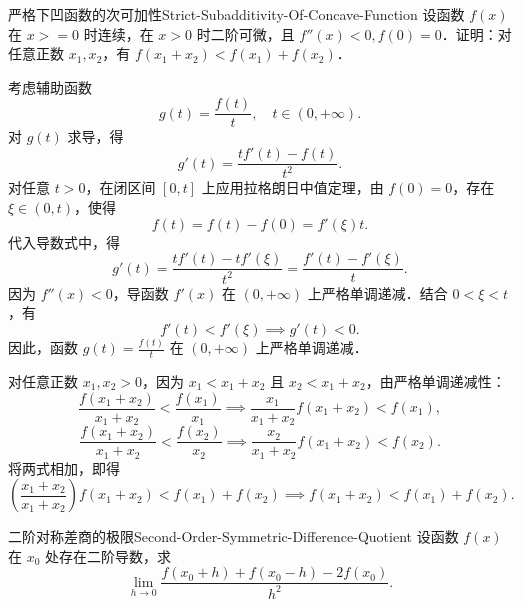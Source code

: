 \begin{problem}{严格下凹函数的次可加性}{Strict-Subadditivity-Of-Concave-Function}
    设函数 $f(x)$ 在 $x >= 0$ 时连续，在 $x > 0$ 时二阶可微，且 $f''(x) < 0, f(0) = 0$．证明：对任意正数 $x_1, x_2$，有 $f(x_1 + x_2) < f(x_1) + f(x_2)$．
\end{problem}

\begin{myproof}
    考虑辅助函数
    \begin{equation}
        g(t) = \frac{f(t)}{t}, \quad t \in (0, +\infty).
    \end{equation}
    对 $g(t)$ 求导，得
    \begin{equation}
        g'(t) = \frac{t f'(t) - f(t)}{t^2}.
    \end{equation}
    对任意 $t > 0$，在闭区间 $[0, t]$ 上应用拉格朗日中值定理，由 $f(0) = 0$，存在 $\xi \in (0, t)$，使得
    \begin{equation}
        f(t) = f(t) - f(0) = f'(\xi)t.
    \end{equation}
    代入导数式中，得
    \begin{equation}
        g'(t) = \frac{t f'(t) - t f'(\xi)}{t^2} = \frac{f'(t) - f'(\xi)}{t}.
    \end{equation}
    因为 $f''(x) < 0$，导函数 $f'(x)$ 在 $(0, +\infty)$ 上严格单调递减．结合 $0 < \xi < t$，有
    \begin{equation}
        f'(t) < f'(\xi) \implies g'(t) < 0.
    \end{equation}
    因此，函数 $g(t) = \frac{f(t)}{t}$ 在 $(0, +\infty)$ 上严格单调递减．

    对任意正数 $x_1, x_2 > 0$，因为 $x_1 < x_1 + x_2$ 且 $x_2 < x_1 + x_2$，由严格单调递减性：
    \begin{equation}
        \frac{f(x_1 + x_2)}{x_1 + x_2} < \frac{f(x_1)}{x_1} \implies \frac{x_1}{x_1 + x_2} f(x_1 + x_2) < f(x_1),
    \end{equation}
    \begin{equation}
        \frac{f(x_1 + x_2)}{x_1 + x_2} < \frac{f(x_2)}{x_2} \implies \frac{x_2}{x_1 + x_2} f(x_1 + x_2) < f(x_2).
    \end{equation}
    将两式相加，即得
    \begin{equation}
        \left( \frac{x_1 + x_2}{x_1 + x_2} \right) f(x_1 + x_2) < f(x_1) + f(x_2) \implies f(x_1 + x_2) < f(x_1) + f(x_2).
    \end{equation}
\end{myproof}

\begin{problem}{二阶对称差商的极限}{Second-Order-Symmetric-Difference-Quotient}
    设函数 $f(x)$ 在 $x_0$ 处存在二阶导数，求
    \begin{equation}
        \lim_{h\to 0} \frac{f(x_0 + h) + f(x_0 - h) - 2f(x_0)}{h^2}.
    \end{equation}
\end{problem}

